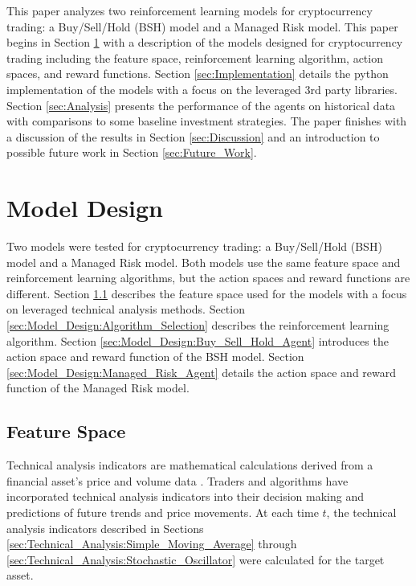 \documentclass[journal]{new-aiaa}
\begin{document}
This paper analyzes two reinforcement learning models for cryptocurrency trading: a Buy/Sell/Hold (BSH) model and a Managed Risk model.
This paper begins in Section \ref{sec:Model_Design} with a description of the models designed for cryptocurrency trading including the feature space, reinforcement learning algorithm, action spaces, and reward functions.
Section \ref{sec:Implementation} details the python implementation of the models with a focus on the leveraged 3rd party libraries.
Section \ref{sec:Analysis} presents the performance of the agents on historical data with comparisons to some baseline investment strategies.
The paper finishes with a discussion of the results in Section \ref{sec:Discussion} and an introduction to possible future work in Section \ref{sec:Future_Work}.

\section{Model Design}\label{sec:Model_Design}
Two models were tested for cryptocurrency trading: a Buy/Sell/Hold (BSH) model and a Managed Risk model.
Both models use the same feature space and reinforcement learning algorithms, but the action spaces and reward functions are different.
Section \ref{sec:Model_Design:Feature_Engineering} describes the feature space used for the models with a focus on leveraged technical analysis methods.
Section \ref{sec:Model_Design:Algorithm_Selection} describes the reinforcement learning algorithm.
Section \ref{sec:Model_Design:Buy_Sell_Hold_Agent} introduces the action space and reward function of the BSH model.
Section \ref{sec:Model_Design:Managed_Risk_Agent} details the action space and reward function of the Managed Risk model.

\subsection{Feature Space}\label{sec:Model_Design:Feature_Engineering}
Technical analysis indicators are mathematical calculations derived from a financial asset's price and volume data \cite{murphy1999technical}.
Traders and algorithms have incorporated technical analysis indicators into their decision making and predictions of future trends and price movements.
At each time $t$, the technical analysis indicators described in Sections \ref{sec:Technical_Analysis:Simple_Moving_Average} through \ref{sec:Technical_Analysis:Stochastic_Oscillator} were calculated for the target asset.
\end{document}
